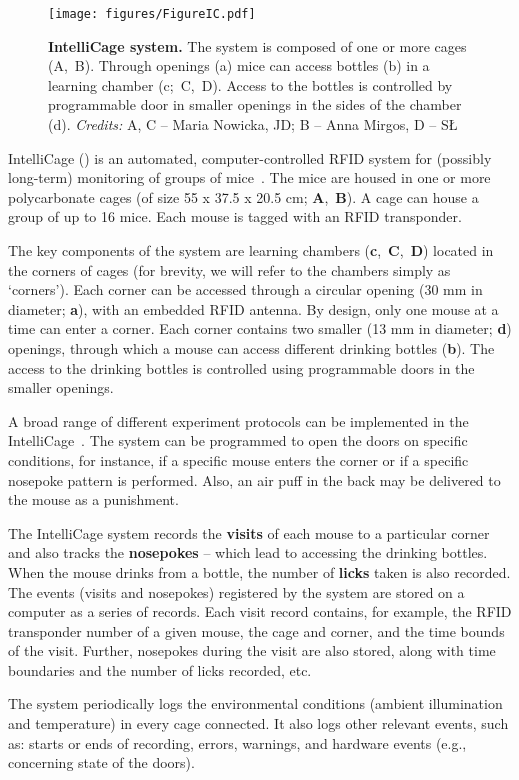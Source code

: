 
\begin{figure*}
  \texttt{[image: figures/FigureIC.pdf]}
  \caption{
    {\bf IntelliCage system.}
    The system is composed of one or more cages (A,~B).
    Through openings (a) mice can access bottles (b) in a learning chamber (c;~C,~D).
    Access to the bottles is controlled by programmable door in smaller openings in the sides
    of the chamber (d). \emph{Credits:} A, C -- Maria Nowicka, JD; B -- Anna Mirgos, D -- SŁ
  }
  \label{intellicageSystem}
\end{figure*}

IntelliCage () is an automated, computer-controlled RFID system for
(possibly long-term) monitoring of groups of
mice~\cite{Galsworthy:2005br,Krackow:2010ck,Puscian:2014cu}. The mice are housed in
one or more polycarbonate cages (of size 55 x 37.5 x 20.5 cm;
\textbf{A},~\textbf{B}). A cage can house a group of up to
16 mice. Each mouse is tagged with an RFID transponder.

The key components of the system are learning chambers
(\textbf{c},~\textbf{C},~\textbf{D})
located in the corners of cages
(for brevity, we will refer to the chambers simply as `corners'). Each
corner can be accessed through a circular opening (30 mm in diameter; \textbf{a}),
with an embedded RFID antenna. By design, only one mouse at a time can enter
a corner. Each corner contains two smaller (13 mm in diameter; \textbf{d}) openings,
through which a mouse can access different drinking bottles (\textbf{b}). The access to the
drinking bottles is controlled using programmable doors in
the smaller openings.


A broad range of different experiment protocols can be implemented in the
IntelliCage~\cite{Knapska:2006cz,Kiryk:2011tk,Endo:2011bs,Radwanska:2012fd,Knapska:2013dj,Smutek:2014da,Puscian:2014cu,Vannoni:2014jt}.
The system can be programmed to open the doors on specific conditions, for
instance, if a specific mouse enters the corner or if a specific nosepoke
pattern is performed. Also, an air puff in the back may be delivered to the
mouse as a punishment.

The IntelliCage system records the \textbf{visits} of
each mouse to a particular corner and also tracks the \textbf{nosepokes}
-- which lead to accessing the drinking bottles. When the mouse drinks
from a bottle, the number of \textbf{licks} taken is also recorded.
The events (visits and nosepokes) registered by the system are stored on a
computer as a series of records. Each visit record contains, for example,
the RFID transponder number of a given mouse, the cage and corner,
and the time bounds of the visit. Further,
nosepokes during the visit are also stored, along with
time boundaries and the number of licks recorded, etc.

The system periodically logs the environmental conditions (ambient
illumination and temperature) in every cage connected. It also logs other
relevant events, such as: starts or ends of recording, errors, warnings, and
hardware events (e.g., concerning state of the doors).
